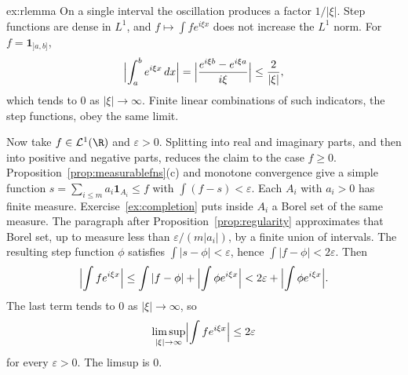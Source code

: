 \begin{solution}{ex:rlemma}
\idea On a single interval the oscillation produces a factor \(1/|\xi|\). Step functions are dense in \(L^1\), and \(f\mapsto\int fe^{i\xi x}\) does not increase the \(L^1\) norm.
\writeup For \(f=\mathbf 1_{]a,b]}\),
\[
\Bigl|\int_a^be^{i\xi x}\,dx\Bigr|=\Bigl|\frac{e^{i\xi b}-e^{i\xi a}}{i\xi}\Bigr|\le\frac2{|\xi|},
\]
which tends to \(0\) as \(|\xi|\to\infty\). Finite linear combinations of such indicators, the step functions, obey the same limit.

Now take \(f\in\mathcal L^1(\R)\) and \(\varepsilon>0\). Splitting into real and imaginary parts, and then into positive and negative parts, reduces the claim to the case \(f\ge0\). Proposition~\ref{prop:measurablefns}(c) and monotone convergence give a simple function \(s=\sum_{i\le m}a_i\mathbf 1_{A_i}\le f\) with \(\int(f-s)<\varepsilon\). Each \(A_i\) with \(a_i>0\) has finite measure. Exercise~\ref{ex:completion} puts inside \(A_i\) a Borel set of the same measure. The paragraph after Proposition~\ref{prop:regularity} approximates that Borel set, up to measure less than \(\varepsilon/(m|a_i|)\), by a finite union of intervals. The resulting step function \(\phi\) satisfies \(\int|s-\phi|<\varepsilon\), hence \(\int|f-\phi|<2\varepsilon\). Then
\[\Bigl|\int fe^{i\xi x}\Bigr|\le\int|f-\phi|+\Bigl|\int\phi e^{i\xi x}\Bigr|<2\varepsilon+\Bigl|\int\phi e^{i\xi x}\Bigr|.\]
The last term tends to \(0\) as \(|\xi|\to\infty\), so
\[\limsup_{|\xi|\to\infty}\Bigl|\int fe^{i\xi x}\Bigr|\le2\varepsilon\]
for every \(\varepsilon>0\). The limsup is \(0\).
\end{solution}

